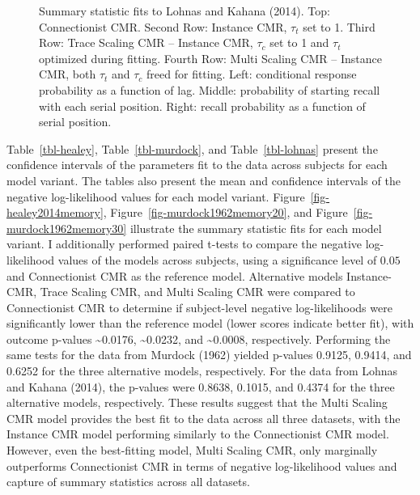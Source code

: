 \documentclass[
  letterpaper,
  11pt,
  english,
  singlespacing,
  headsepline]{MastersDoctoralThesis}
\begin{document}
\begin{figure}
\caption{\label{fig-lohnas2014memory}Summary statistic fits to Lohnas
and Kahana (2014). Top: Connectionist CMR. Second Row: Instance CMR,
\(\tau_{t}\) set to 1. Third Row: Trace Scaling CMR -- Instance CMR,
\(\tau_{c}\) set to 1 and \(\tau_{t}\) optimized during fitting. Fourth
Row: Multi Scaling CMR -- Instance CMR, both \(\tau_t\) and \(\tau_c\)
freed for fitting. Left: conditional response probability as a function
of lag. Middle: probability of starting recall with each serial
position. Right: recall probability as a function of serial position.}

\end{figure}%

Table~\ref{tbl-healey}, Table~\ref{tbl-murdock}, and
Table~\ref{tbl-lohnas} present the confidence intervals of the
parameters fit to the data across subjects for each model variant. The
tables also present the mean and confidence intervals of the negative
log-likelihood values for each model variant.
Figure~\ref{fig-healey2014memory}, Figure~\ref{fig-murdock1962memory20},
and Figure~\ref{fig-murdock1962memory30} illustrate the summary
statistic fits for each model variant. I additionally performed paired
t-tests to compare the negative log-likelihood values of the models
across subjects, using a significance level of \(0.05\) and
Connectionist CMR as the reference model. Alternative models
Instance-CMR, Trace Scaling CMR, and Multi Scaling CMR were compared to
Connectionist CMR to determine if subject-level negative log-likelihoods
were significantly lower than the reference model (lower scores indicate
better fit), with outcome p-values \textasciitilde0.0176,
\textasciitilde0.0232, and \textasciitilde0.0008, respectively.
Performing the same tests for the data from Murdock (1962) yielded
p-values 0.9125, 0.9414, and 0.6252 for the three alternative models,
respectively. For the data from Lohnas and Kahana (2014), the p-values
were 0.8638, 0.1015, and 0.4374 for the three alternative models,
respectively. These results suggest that the Multi Scaling CMR model
provides the best fit to the data across all three datasets, with the
Instance CMR model performing similarly to the Connectionist CMR model.
However, even the best-fitting model, Multi Scaling CMR, only marginally
outperforms Connectionist CMR in terms of negative log-likelihood values
and capture of summary statistics across all datasets.
\end{document}
